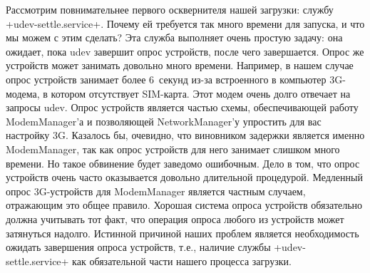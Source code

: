 \documentclass[10pt,oneside,a4paper]{article}
\begin{document}
Рассмотрим повнимательнее первого осквернителя нашей загрузки: службу
+udev-settle.service+. Почему ей требуется так много времени для запуска, и что
мы можем с этим сделать? Эта служба выполняет очень простую задачу: она ожидает,
пока udev завершит опрос устройств, после чего завершается. Опрос же устройств
может занимать довольно много времени. Например, в нашем случае опрос устройств
занимает более 6~секунд из-за встроенного в компьютер 3G-модема, в котором
отсутствует SIM-карта. Этот модем очень долго отвечает на запросы udev. Опрос
устройств является частью схемы, обеспечивающей работу ModemManager'а и
позволяющей NetworkManager'у упростить для вас настройку 3G. Казалось бы,
очевидно, что виновником задержки является именно ModemManager, так как опрос
устройств для него занимает слишком много времени. Но такое обвинение будет
заведомо ошибочным. Дело в том, что опрос устройств очень часто оказывается довольно
длительной процедурой. Медленный опрос 3G-устройств для ModemManager является
частным случаем, отражающим это общее правило. Хорошая система опроса устройств
обязательно должна учитывать тот факт, что операция опроса любого из устройств
может затянуться надолго. Истинной причиной наших проблем является необходимость
ожидать завершения опроса устройств, т.е., наличие службы
+udev-settle.service+ как обязательной части нашего процесса загрузки.
\end{document}
